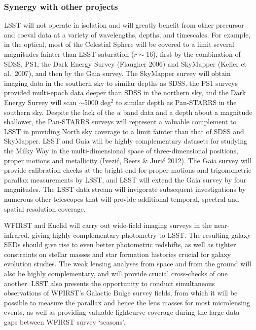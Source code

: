 \subsubsection{  Synergy with other projects }

LSST will not operate in isolation and will greatly benefit from other precursor and coeval
data at a variety of wavelengths, depths, and timescales. For example,
in the optical, most of the Celestial
Sphere will be covered to a limit several magnitudes fainter than LSST saturation
($r\sim16$), first by the combination of SDSS, PS1, the Dark Energy Survey (Flaugher 2006) and SkyMapper (Keller et al.~2007),
and then by the Gaia survey. The SkyMapper survey will obtain imaging data in the southern
sky to similar depths as SDSS, the PS1 surveys provided multi-epoch data deeper
than SDSS in the northern sky, and the Dark Energy Survey will scan
$\sim$5000 deg$^2$ to similar depth as Pan-STARRS in the southern sky. Despite the lack of
the $u$ band data and a depth about a magnitude shallower, the Pan-STARRS surveys
will represent a valuable complement to LSST in providing North sky coverage to a limit
fainter than that of SDSS and SkyMapper. LSST and Gaia will
be highly complementary datasets for studying the Milky Way in the multi-dimensional space of
three-dimensional positions, proper motions and metallicity (Ivezi\'{c}, Beers \& Juri\'{c} 2012).
The Gaia survey will provide calibration checks at the bright end for proper
motions and trigonometric parallax measurements by LSST, and LSST will extend the
Gaia survey by four magnitudes. The LSST data stream will invigorate subsequent
investigations by numerous other telescopes that will provide
additional temporal, spectral and spatial resolution coverage.

WFIRST and Euclid will carry out wide-field imaging surveys in the
near-infrared, giving highly complementary photometry to LSST.  The
resulting galaxy SEDs should give rise to even better photometric
redshifts, as well as tighter constraints on stellar masses and star
formation histories crucial for galaxy evolution studies.  The weak
lensing analyses from space and from the ground will also be highly
complementary, and will provide crucial cross-checks of one another.
LSST also presents the opportunity to conduct simultaneous observations
of WFIRST's Galactic Bulge survey fields, from which it will be possible to
measure the parallax and hence the lens masses for most microlensing
events, as well as providing valuable lightcurve coverage during the large
data gaps between WFIRST survey `seasons'.

